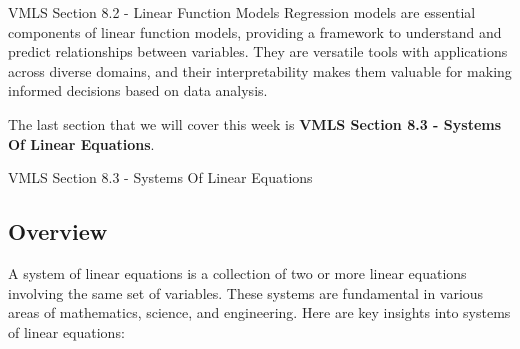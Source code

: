 \begin{notes}{VMLS Section 8.2 - Linear Function Models}
    Regression models are essential components of linear function models, providing a framework to understand and predict relationships between variables. They are versatile tools with applications across 
    diverse domains, and their interpretability makes them valuable for making informed decisions based on data analysis.
\end{notes}

The last section that we will cover this week is \textbf{VMLS Section 8.3 - Systems Of Linear Equations}.

\begin{notes}{VMLS Section 8.3 - Systems Of Linear Equations}
    \subsection*{Overview}

    A system of linear equations is a collection of two or more linear equations involving the same set of variables. These systems are fundamental in various areas of mathematics, science, and engineering. 
    Here are key insights into systems of linear equations:


\end{notes}
